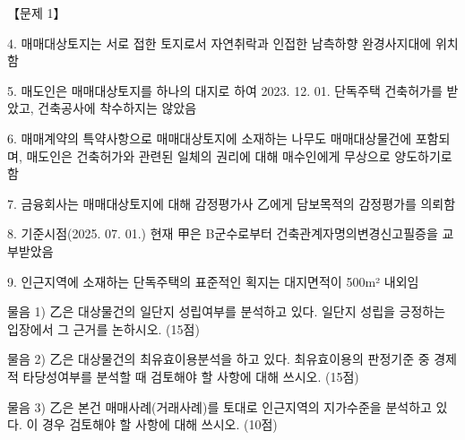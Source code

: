\begin{longquestion}{【문제 1】}
\begin{framedtext}
4. 매매대상토지는 서로 접한 토지로서 자연취락과 인접한 남측하향 완경사지대에 위치함 \par
5. 매도인은 매매대상토지를 하나의 대지로 하여 2023. 12. 01. 단독주택 건축허가를 받았고, 건축공사에 착수하지는 않았음 \par
6. 매매계약의 특약사항으로 매매대상토지에 소재하는 나무도 매매대상물건에 포함되며, 매도인은 건축허가와 관련된 일체의 권리에 대해 매수인에게 무상으로 양도하기로 함 \par
7. 금융회사는 매매대상토지에 대해 감정평가사 乙에게 담보목적의 감정평가를 의뢰함 \par
8. 기준시점(2025. 07. 01.) 현재 甲은 B군수로부터 건축관계자명의변경신고필증을 교부받았음 \par
9. 인근지역에 소재하는 단독주택의 표준적인 획지는 대지면적이 500m² 내외임 \par
\end{framedtext}
\medskip\noindent 물음 1) 乙은 대상물건의 일단지 성립여부를 분석하고 있다. 일단지 성립을 긍정하는 입장에서 그 근거를 논하시오. (15점) \par
\medskip\noindent 물음 2) 乙은 대상물건의 최유효이용분석을 하고 있다. 최유효이용의 판정기준 중 경제적 타당성여부를 분석할 때 검토해야 할 사항에 대해 쓰시오. (15점) \par
\medskip\noindent 물음 3) 乙은 본건 매매사례(거래사례)를 토대로 인근지역의 지가수준을 분석하고 있다. 이 경우 검토해야 할 사항에 대해 쓰시오. (10점) \par
\end{longquestion}
